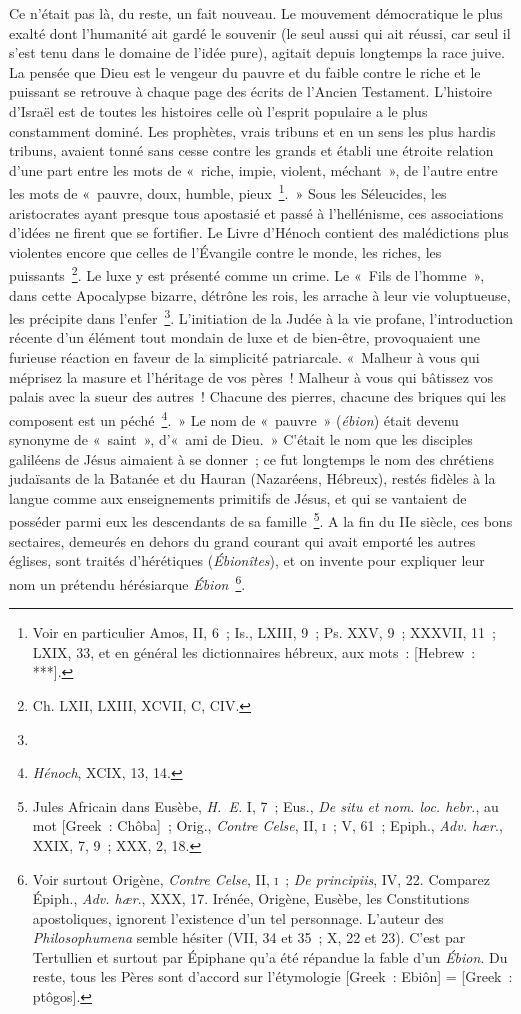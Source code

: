 \documentclass[french,twoside]{book} %
\begin{document}
Ce n’était pas là, du reste, un fait nouveau. Le mouvement démocratique le plus exalté dont l’humanité ait gardé le souvenir (le seul aussi qui ait réussi, car seul il s’est tenu dans le domaine de l’idée pure), agitait depuis longtemps la race juive. La pensée que Dieu est le vengeur du pauvre et du faible contre le riche et le puissant se retrouve à chaque page des écrits de l’Ancien Testament. L’histoire d’Israël est de toutes les histoires celle où l’esprit populaire a le plus constamment dominé. Les prophètes, vrais tribuns et en un sens les plus hardis tribuns, avaient tonné sans cesse contre les grands et établi une étroite relation d’une part entre les mots de « riche, impie, violent, méchant », de l’autre entre les mots de « pauvre, doux, humble, pieux \footnote{Voir en particulier Amos, II, 6 ; Is., LXIII, 9 ; Ps. XXV, 9 ; XXXVII, 11 ; LXIX, 33, et en général les dictionnaires hébreux, aux mots : [Hebrew : ***].}. » Sous les Séleucides, les aristocrates ayant presque tous apostasié et passé à l’hellénisme, ces associations d’idées ne firent que se fortifier. Le Livre d’Hénoch contient des malédictions plus violentes encore que celles de l’Évangile contre le monde, les riches, les puissants \footnote{Ch. LXII, LXIII, XCVII, C, CIV.}. Le luxe y est présenté comme un crime. Le « Fils de l’homme », dans cette Apocalypse bizarre, détrône les rois, les arrache à leur vie voluptueuse, les précipite dans l’enfer \footnote{}. L’initiation de la Judée à la vie profane, l’introduction récente d’un élément tout mondain de luxe et de bien-être, provoquaient une furieuse réaction en faveur de la simplicité patriarcale. « Malheur à vous qui méprisez la masure et l’héritage de vos pères ! Malheur à vous qui bâtissez vos palais avec la sueur des autres ! Chacune des pierres, chacune des briques qui les composent est un péché \footnote{{\itshape Hénoch}, XCIX, 13, 14.}. » Le nom de « pauvre » ({\itshape ébion}) était devenu synonyme de « saint », d’« ami de Dieu. » C’était le nom que les disciples galiléens de Jésus aimaient à se donner ; ce fut longtemps le nom des chrétiens judaïsants de la Batanée et du Hauran (Nazaréens, Hébreux), restés fidèles à la langue comme aux enseignements primitifs de Jésus, et qui se vantaient de posséder parmi eux les descendants de sa famille \footnote{ Jules Africain dans Eusèbe, {\itshape H. E.} I, 7 ; Eus., {\itshape De situ et nom. loc. hebr.}, au mot [Greek : Chôba] ; Orig., {\itshape Contre Celse}, II, \textsc{i} ; V, 61 ; Epiph., {\itshape Adv. hær}., XXIX, 7, 9 ; XXX, 2, 18.}. A la fin du IIe siècle, ces bons sectaires, demeurés en dehors du grand courant qui avait emporté les autres églises, sont traités d’hérétiques ({\itshape Ébionîtes}), et on invente pour expliquer leur nom un prétendu hérésiarque {\itshape Ébion} \footnote{ Voir surtout Origène, {\itshape Contre Celse}, II, \textsc{i} ; {\itshape De principiis}, IV, 22. Comparez Épiph., {\itshape Adv. hær}., XXX, 17. Irénée, Origène, Eusèbe, les Constitutions apostoliques, ignorent l’existence d’un tel personnage. L’auteur des {\itshape Philosophumena} semble hésiter (VII, 34 et 35 ; X, 22 et 23). C’est par Tertullien et surtout par Épiphane qu’a été répandue la fable d’un {\itshape Ébion}. Du reste, tous les Pères sont d’accord sur l’étymologie [Greek : Ebiôn] = [Greek : ptôgos].}.\par
\end{document}
